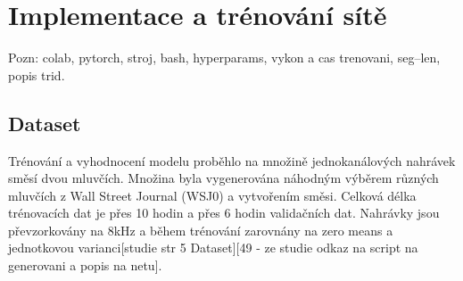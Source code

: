



\chapter{Implementace a trénování sítě}
\label{implementace}
Pozn: colab, pytorch, stroj, bash, hyperparams, vykon a cas trenovani, seg--len, popis trid.

\section{Dataset}
Trénování a vyhodnocení modelu proběhlo na množině jednokanálových nahrávek směsí dvou mluvčích. Množina byla vygenerována náhodným výběrem různých mluvčích z Wall Street Journal (WSJ0) a vytvořením směsi. Celková délka trénovacích dat je přes 10 hodin a přes 6 hodin validačních dat. Nahrávky jsou převzorkovány na 8kHz a během trénování zarovnány na zero means a jednotkovou varianci[studie str 5 Dataset][49 - ze studie odkaz na script na generovani a popis na netu].

